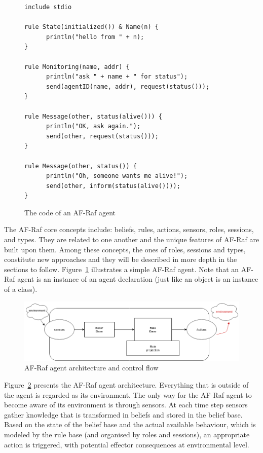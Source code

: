 \documentclass[a4paper,12pt,oneside,fleqn]{book} %
\begin{document}
\begin{figure}\footnotesize %
\begin{verbatim}
include stdio

rule State(initialized()) & Name(n) {
      println("hello from " + n);
}

rule Monitoring(name, addr) {
      println("ask " + name + " for status");
      send(agentID(name, addr), request(status()));
}

rule Message(other, status(alive())) {
      println("OK, ask again.");
      send(other, request(status()));
}

rule Message(other, status()) {
      println("Oh, someone wants me alive!");
      send(other, inform(status(alive())));
}
\end{verbatim}
\caption{The code of an AF-Raf agent}
\label{fig:AF-Raf}
\end{figure} %

The AF-Raf core concepts include: beliefs, rules, actions, sensors, roles,
sessions, and types. They are related to one another and the unique
features of AF-Raf are built upon them. Among these concepts, the ones of
roles, sessions and types, constitute new approaches and they will be
described in more depth in the sections to follow. Figure~\ref{fig:AF-Raf}
illustrates a simple AF-Raf agent. Note that an AF-Raf agent is an instance
of an agent declaration (just like an object is an instance of a class).

\begin{figure}\footnotesize %
\includegraphics{AF-RafArchitecture2.png}
\caption{AF-Raf agent architecture and control flow}
\label{fig:AF-RafArch}
\end{figure} %

Figure~\ref{fig:AF-RafArch} presents the AF-Raf agent architecture.
Everything that is outside of the agent is regarded as its environment. The
only way for the AF-Raf agent to become aware of its environment is through
sensors. At each time step sensors gather knowledge that is transformed in
beliefs and stored in the belief base. Based on the state of the belief
base and the actual available behaviour, which is modeled by the rule base
(and organised by roles and sessions), an appropriate action is triggered,
with potential effector consequences at environmental level.
\end{document}
